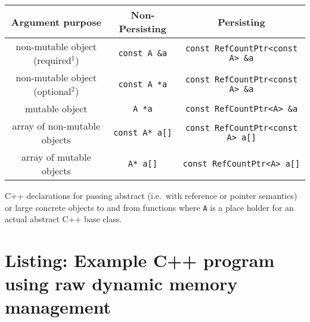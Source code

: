 \documentclass[pdf,ps2pdf,11pt]{SANDreport}
\begin{document}
\begin{center}
\begin{minipage}{{}\textwidth}
\begin{tabular}{|c|c|c|}
\hline
Argument purpose
& Non-Persisting
& Persisting \\
\hline
\hline
non-mutable object (required$^1$)
& {}\texttt{const A \&a}
& {}\texttt{const RefCountPtr<const A> \&a} \\
\hline
non-mutable object (optional$^2$)
& {}\texttt{const A *a}
& {}\texttt{const RefCountPtr<const A> \&a} \\
\hline
mutable object
& {}\texttt{A *a}
& {}\texttt{const RefCountPtr<A> \&a} \\
\hline
array of non-mutable objects
& {}\texttt{const A* a[]}
& {}\texttt{const RefCountPtr<const A> a[]} \\
\hline
array of mutable objects
& {}\texttt{A* a[]}
& {}\texttt{const RefCountPtr<A> a[]} \\
\hline
\end{tabular}
\begin{center}
C++ declarations for passing abstract (i.e.~with reference or pointer
semantics) or large concrete objects to and from functions where
{}\texttt{A} is a place holder for an actual abstract C++ base class.
\end{center}
\end{minipage}
\end{center}

%
\section{Listing: Example C++ program using raw dynamic memory management}
\label{rcpqs:apdx:ex-prg}
%
\end{document}
